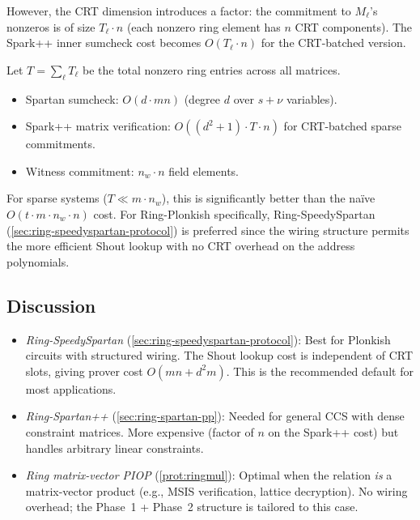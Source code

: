 However, the CRT dimension introduces a factor: the commitment to $M_\ell$'s nonzeros is of size $T_\ell \cdot n$ (each nonzero ring element has $n$ CRT components). The Spark++ inner sumcheck cost becomes $O(T_\ell \cdot n)$ for the CRT-batched version.

Let $T = \sum_\ell T_\ell$ be the total nonzero ring entries across all matrices.
\begin{itemize}
    \item Spartan sumcheck: $O(d \cdot mn)$ (degree $d$ over $s + \nu$ variables).
    \item Spark++ matrix verification: $O((d^2 + 1) \cdot T \cdot n)$ for CRT-batched sparse commitments.
    \item Witness commitment: $n_w \cdot n$ field elements.
\end{itemize}

For sparse systems ($T \ll m \cdot n_w$), this is significantly better than the na\"ive $O(t \cdot m \cdot n_w \cdot n)$ cost. For Ring-Plonkish specifically, Ring-SpeedySpartan (\cref{sec:ring-speedyspartan-protocol}) is preferred since the wiring structure permits the more efficient Shout lookup with no CRT overhead on the address polynomials.


\subsection{Discussion}
\label{sec:ring-np-discussion}

\begin{itemize}
    \item \emph{Ring-SpeedySpartan} (\cref{sec:ring-speedyspartan-protocol}): Best for Plonkish circuits with structured wiring. The Shout lookup cost is independent of CRT slots, giving prover cost $O(mn + d^2 m)$. This is the recommended default for most applications.
    \item \emph{Ring-Spartan++} (\cref{sec:ring-spartan-pp}): Needed for general CCS with dense constraint matrices. More expensive (factor of $n$ on the Spark++ cost) but handles arbitrary linear constraints.
    \item \emph{Ring matrix-vector PIOP} (\cref{prot:ringmul}): Optimal when the relation \emph{is} a matrix-vector product (e.g., MSIS verification, lattice decryption). No wiring overhead; the Phase~1 + Phase~2 structure is tailored to this case.
\end{itemize}

